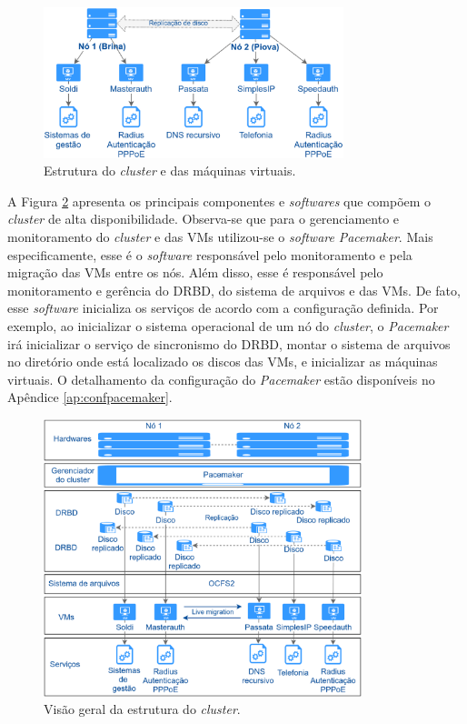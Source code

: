 \begin{figure}[h!]
 \centering
 \includegraphics[width=330px]{img/projeto_vms.eps}
 \caption{Estrutura do \textit{cluster} e das máquinas virtuais.}
 \label{fig:projeto_vms}
\end{figure}

A Figura \ref{fig:projeto_estrutura} apresenta os principais componentes e \textit{softwares} que compõem o \textit{cluster} de alta 
disponibilidade. Observa-se que para o gerenciamento e monitoramento do \textit{cluster} e das \acp{VM} utilizou-se o \textit{software} 
\textit{Pacemaker}. Mais especificamente, esse é o \textit{software} responsável pelo monitoramento e pela migração das \acp{VM} entre os nós. 
Além disso, esse é responsável pelo monitoramento e gerência do \ac{DRBD}, do sistema de arquivos e das \acp{VM}. De fato, esse \textit{software} 
inicializa os serviços de acordo com a configuração definida. Por exemplo, ao inicializar o sistema operacional de um nó do \textit{cluster}, 
o \textit{Pacemaker} irá inicializar o serviço de sincronismo do \ac{DRBD}, montar o sistema de arquivos no diretório onde está localizado os 
discos das \acp{VM}, e inicializar as máquinas virtuais. O detalhamento da configuração do \textit{Pacemaker} estão disponíveis no 
Apêndice \ref{ap:confpacemaker}.

\begin{figure}[h!]
 \centering
 \includegraphics[width=350px]{img/projeto_estrutura.eps}
 \caption{Visão geral da estrutura do \textit{cluster}.}
 \label{fig:projeto_estrutura}
\end{figure}

